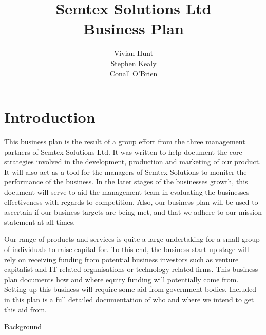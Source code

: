 \documentclass[a4paper,12pt]{article}
\begin{document}
\title{Semtex Solutions Ltd \\ Business Plan}

\author{Vivian Hunt \\ Stephen Kealy \\ Conall O'Brien}

\maketitle

\newpage


\section{Introduction}

This business plan is the result of a group effort from the three
management partners of Semtex Solutions Ltd. It was written to help
document the core strategies involved in the development, production and
marketing of our product. It will also act as a tool for the managers of
Semtex Solutions to moniter the performance of the business. In the
later stages of the businesses growth, this document will serve to aid
the management team in evaluating the businesses effectiveness with
regards to competition. Also, our business plan will be used to
ascertain if our business targets are being met, and that we adhere to
our mission statement at all times.

Our range of products and services is quite a large undertaking for a
small group of individuals to raise capital for. To this end, the
business start up stage will rely on receiving funding from potential
business investors such as venture capitalist and IT related
organisations or technology related firms. This business plan documents
how and where equity funding will potentially come from. Setting up this
business will require some aid from government bodies. Included in this
plan is a full detailed documentation of who and where we intend to get
this aid from. 

Background
\end{document}
